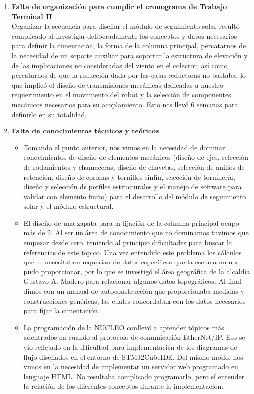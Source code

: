 \begin{enumerate}
    \item \textbf{Falta de organización para cumplir el cronograma de Trabajo Terminal II}\\
    Organizar la secuencia para diseñar el módulo de seguimiento solar resultó complicado al investigar deliberadamente los conceptos y datos necesarios para definir la cimentación, la forma de la columna principal, percatarnos de la necesidad de un soporte auxiliar para soportar la estructura de elevación y de las implicaciones no consideradas del viento en el colector, así como percatarnos de que la reducción dada por las cajas reductoras no bastaba, lo que implicó el diseño de transmisiones mecánicas dedicadas a nuestro requerimiento en el movimiento del robot y la selección de componentes mecánicos necesarios para su acoplamiento. Esto nos llevó 6 semanas para definirlo en su totalidad.
    \item \textbf{Falta de conocimientos técnicos y teóricos}
    \begin{itemize}
        \item Tomando el punto anterior, nos vimos en la necesidad de dominar conocimientos de diseño de elementos mecánicos (diseño de ejes, selección de rodamientos y chumaceras, diseño de chavetas, selección de anillos de retención, diseño de coronas y tornillos sinfín, selección de tornillería, diseño y selección de perfiles estructurales y el manejo de software para validar con elemento finito) para el desarrollo del módulo de seguimiento solar y el módulo estructural.
        \item El diseño de una zapata para la fijación de la columna principal ocupo más de 2. Al ser un área de conocimiento que no dominamos tuvimos que empezar desde cero, teniendo al principio dificultades para buscar la referencias de este tópico. Una vez entendido este problema los cálculos que se necesitaban requerían de datos específicos que la escuela no nos pudo proporcionar, por lo que se investigó el área geográfica de la alcaldía Gustavo A. Madero para relacionar algunos datos topográficos. Al final dimos con un manual de autoconstrucción que proporcionaba medidas y construcciones genéricas, las cuales concordaban con los datos necesarios para fijar la cimentación.
        \item La programación de la NUCLEO conllevó a aprender tópicos más adentrados en cuando al protocolo de comunicación EtherNet/IP. Eso se vio reflejado en la dificultad para implementación de los diagramas de flujo diseñados en el entorno de STM32CubeIDE. Del mismo modo, nos vimos en la necesidad de implementar un servidor web programado en lenguaje HTML. No resultaba complicado programarlo, pero sí entender la relación de los diferentes conceptos durante la implementación.

\end{itemize}
\end{enumerate}
